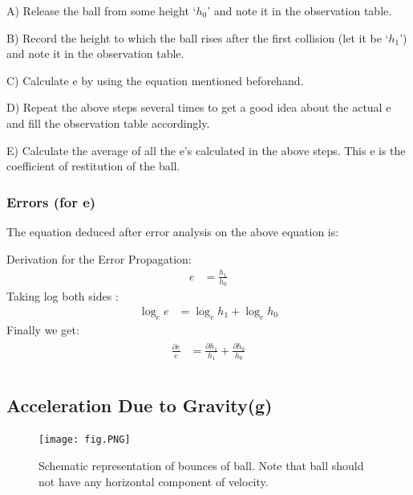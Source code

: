 \documentclass[11pt]{scrartcl} %
\begin{document}
A) Release the ball from some height ‘$h_0$’ and note it in the observation table. \par

B) Record the height to which the ball rises after the first collision (let it be ‘$h_1$’) and note it in the observation table. \par

C) Calculate e by using the equation mentioned beforehand. \par

D) Repeat the above steps several times to get a good idea about the actual e and fill the observation table accordingly. \par

E) Calculate the average of all the e’s calculated in the above steps. This e is the coefficient of restitution of the ball. \par

\subsubsection{Errors (for e)}
The equation deduced after error analysis on the above equation is:\par
Derivation for the Error Propagation:
\begin{align} 
		e &= \frac{h_1}{h_0} \nonumber
\end{align}
Taking log both sides :
\begin{align}
\log_e e &= \log_e h_1 + \log_e h_0 \nonumber
\end{align}
   Finally we get:
\begin{align} 
	\begin{split}
		\frac{\partial{e}}{e} &= \frac{\partial{h_1}}{h_1} + \frac{\partial{h_0}}{h_0}\\
	\end{split}					
\end{align}

\subsection{Acceleration Due to Gravity(g)}

\begin{figure}
    \centering
    \texttt{[image: fig.PNG]}
    \caption{Schematic representation of bounces of ball. Note that ball should not have any horizontal component of velocity.}
    \label{fig:my_label}
\end{figure}\n
\end{document}
